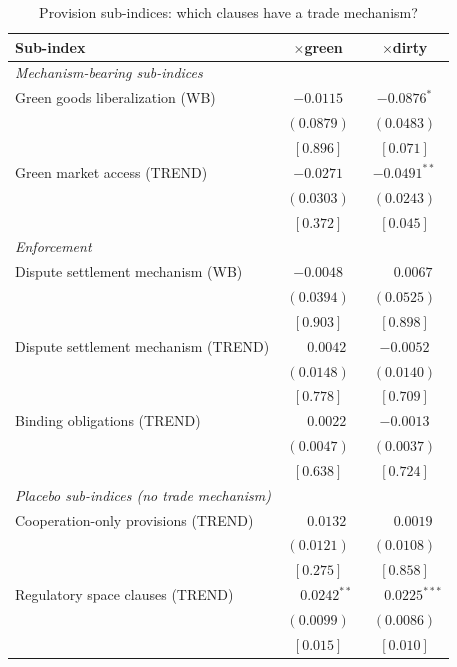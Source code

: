 \begin{table}[htbp]
\centering
\footnotesize
\caption{Provision sub-indices: which clauses have a trade mechanism?}
\label{tab:subindices}
\begin{threeparttable}
\begin{tabular}{lcc}
\toprule
Sub-index & $\times$green & $\times$dirty \\
\midrule
\multicolumn{3}{l}{\textit{Mechanism-bearing sub-indices}} \\
\addlinespace
\quad Green goods liberalization (WB) & $-0.0115$ & $-0.0876^{*}$ \\
 & $(0.0879)$ & $(0.0483)$ \\
 & $[0.896]$ & $[0.071]$ \\
\addlinespace
\quad Green market access (TREND) & $-0.0271$ & $-0.0491^{**}$ \\
 & $(0.0303)$ & $(0.0243)$ \\
 & $[0.372]$ & $[0.045]$ \\
\midrule
\multicolumn{3}{l}{\textit{Enforcement}} \\
\addlinespace
\quad Dispute settlement mechanism (WB) & $-0.0048$ & $\phantom{-}0.0067$ \\
 & $(0.0394)$ & $(0.0525)$ \\
 & $[0.903]$ & $[0.898]$ \\
\addlinespace
\quad Dispute settlement mechanism (TREND) & $\phantom{-}0.0042$ & $-0.0052$ \\
 & $(0.0148)$ & $(0.0140)$ \\
 & $[0.778]$ & $[0.709]$ \\
\addlinespace
\quad Binding obligations (TREND) & $\phantom{-}0.0022$ & $-0.0013$ \\
 & $(0.0047)$ & $(0.0037)$ \\
 & $[0.638]$ & $[0.724]$ \\
\midrule
\multicolumn{3}{l}{\textit{Placebo sub-indices (no trade mechanism)}} \\
\addlinespace
\quad Cooperation-only provisions (TREND) & $\phantom{-}0.0132$ & $\phantom{-}0.0019$ \\
 & $(0.0121)$ & $(0.0108)$ \\
 & $[0.275]$ & $[0.858]$ \\
\addlinespace
\quad Regulatory space clauses (TREND) & $\phantom{-}0.0242^{**}$ & $\phantom{-}0.0225^{***}$ \\
 & $(0.0099)$ & $(0.0086)$ \\
 & $[0.015]$ & $[0.010]$ \\

\end{tabular}
\end{threeparttable}
\end{table}
